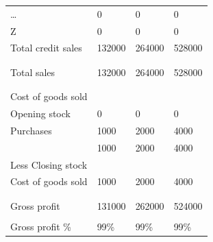 \documentclass{article}
\begin{document}
\begin{table}[H]
\begin{tabular}{llll}
…                                  & 0      & 0      & 0      \\
Z                                  & 0      & 0      & 0      \\
Total credit sales                 & 132000 & 264000 & 528000 \\
                                   &        &        &        \\
                                   &        &        &        \\
Total sales                        & 132000 & 264000 & 528000 \\
                                   &        &        &        \\
                                   &        &        &        \\
Cost of goods sold                 &        &        &        \\
Opening stock                      & 0      & 0      & 0      \\
Purchases                          & 1000   & 2000   & 4000   \\
                                   & 1000   & 2000   & 4000   \\
Less Closing stock                 &        &        &        \\
Cost of goods sold                 & 1000   & 2000   & 4000   \\
                                   &        &        &        \\
                                   &        &        &        \\
Gross profit                       & 131000 & 262000 & 524000 \\
                                   &        &        &        \\
Gross profit \%                    & 99\%   & 99\%   & 99\%  
\end{tabular}
\end{table}
\end{document}

